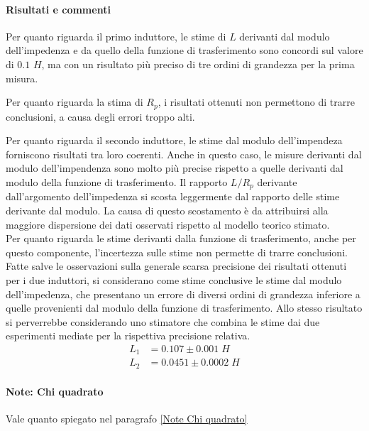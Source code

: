 \break
\paragraph{Risultati e commenti}

Per quanto riguarda il primo induttore, le stime di $L$ derivanti dal modulo dell'impedenza e da quello della funzione di trasferimento sono concordi sul valore di $0.1$ $H$, ma con un risultato più preciso di tre ordini di grandezza per la prima misura.

Per quanto riguarda la stima di $ R_{p} $, i risultati ottenuti non permettono di trarre conclusioni, a causa degli errori troppo alti.




Per quanto riguarda il secondo induttore, le stime dal modulo dell'impendeza forniscono risultati tra loro coerenti. Anche in questo caso, le misure derivanti dal modulo dell'impendenza sono molto più precise rispetto a quelle derivanti dal modulo della funzione di trasferimento. 
%
Il rapporto $ L / R_{p} $ derivante dall'argomento dell'impedenza si scosta leggermente dal rapporto delle stime derivante dal modulo. La causa di questo scostamento è da attribuirsi alla maggiore dispersione dei dati osservati rispetto al modello teorico stimato.\\ 
%
Per quanto riguarda le stime derivanti dalla funzione di trasferimento, anche per questo componente, l'incertezza sulle stime non permette di trarre conclusioni.\\
%
%

%
Fatte salve le osservazioni sulla generale scarsa precisione dei risultati ottenuti per i due induttori, si considerano come stime conclusive le stime dal modulo dell'impedenza, che presentano un errore di diversi ordini di grandezza inferiore a quelle provenienti dal modulo della funzione di trasferimento. Allo stesso risultato si perverrebbe considerando uno stimatore che combina le stime dai due esperimenti mediate per la rispettiva precisione relativa.
%
\begin{align*}
L_{1} & = 0.107   \pm 0.001 \;H \\
L_{2} & = 0.0451  \pm 0.0002 \;H
\end{align*}

\paragraph*{Note: Chi quadrato}
%
Vale quanto spiegato nel paragrafo \ref{Note Chi quadrato}



